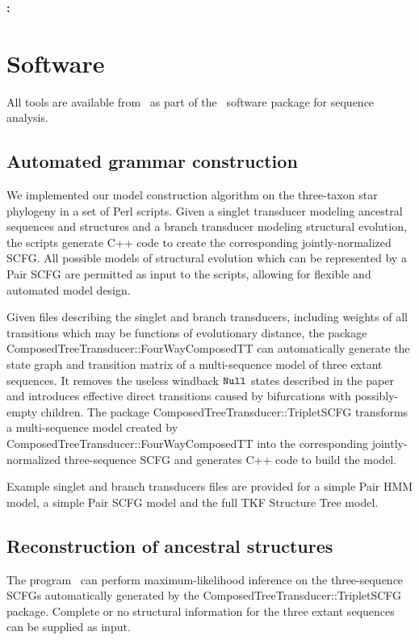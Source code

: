 \documentclass[10pt]{article}
\date{}
\begin{document}
\begin{flushleft}
  {\Large
    \textbf{\titlestring: }
  }
\\
\authorstring
\end{flushleft}


\newpage
\section{Software}

All tools are available from \darturl\ as part of the \dart\ software package for sequence analysis.

\subsection{Automated grammar construction}
We implemented our model construction algorithm on the three-taxon star phylogeny
in a set of Perl scripts.
Given a singlet transducer modeling ancestral sequences and structures and
a branch transducer modeling structural evolution,
the scripts generate C++ code to create the corresponding jointly-normalized SCFG.
All possible models of structural evolution which can be represented by a Pair SCFG
are permitted as input to the scripts,
allowing for flexible and automated model design.

Given files describing the singlet and branch transducers,
including weights of all transitions which may be functions of evolutionary distance,
the package ComposedTreeTransducer::FourWayComposedTT can automatically generate
the state graph and transition matrix of a multi-sequence model of three extant sequences.
It removes the useless windback $\mathtt{Null}$ states described in the paper and
introduces effective direct transitions caused by bifurcations with possibly-empty children.
The package ComposedTreeTransducer::TripletSCFG transforms a multi-sequence
model created by ComposedTreeTransducer::FourWayComposedTT into the 
corresponding jointly-normalized three-sequence SCFG
and generates C++ code to build the model.

Example singlet and branch transducers files are provided for a simple 
Pair HMM model, a simple Pair SCFG model and the full TKF Structure Tree model.

\subsection{Reconstruction of ancestral structures}
The program \indiegram\ can perform maximum-likelihood inference on the
three-sequence SCFGs automatically generated by the ComposedTreeTransducer::TripletSCFG package.
Complete or no structural information for the three extant sequences can be supplied
as input.
\end{document}
